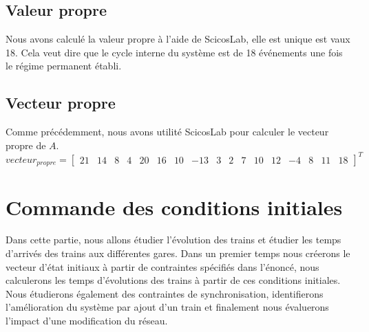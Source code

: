 \subsection{Valeur propre}
Nous avons calculé la valeur propre à l'aide de ScicosLab, elle est unique est vaux 18. Cela veut dire que le cycle interne du système est de 18 événements une fois le régime permanent établi.
\subsection{Vecteur propre}
Comme précédemment, nous avons utilité ScicosLab pour calculer le vecteur propre de $A$.
\begin{equation}
vecteur_{propre} = 
\left[
\begin{array}{ccccccccccccccccc}
21 & 14 & 8 & 4 & 20 & 16 & 10 & -13 & 3 & 2 & 7 & 10 & 12 & -4 & 8 & 11 & 18	
\end{array} \right]^T
\end{equation}

\section{Commande des conditions initiales}
Dans cette partie, nous allons étudier l'évolution des trains et étudier les temps d'arrivés des trains aux différentes gares. 
Dans un premier temps nous créerons le vecteur d'état initiaux à partir de contraintes spécifiés dans l'énoncé, nous calculerons les temps d'évolutions des trains à partir de ces conditions initiales. Nous étudierons également des contraintes de synchronisation, identifierons l'amélioration du système par ajout d'un train et finalement nous évaluerons l'impact d'une modification du réseau.
